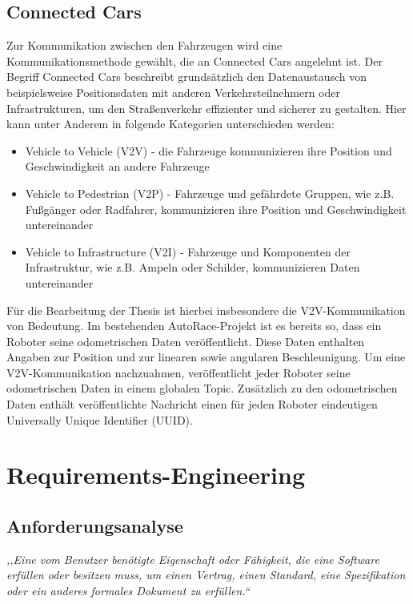 \subsection{Connected Cars}
Zur Kommunikation zwischen den Fahrzeugen wird eine Kommunikationsmethode gewählt, die an Connected Cars angelehnt ist. Der Begriff Connected Cars beschreibt grundsätzlich den Datenaustausch
von beispielsweise Positionsdaten mit anderen Verkehrsteilnehmern oder Infrastrukturen, um den Straßenverkehr effizienter und sicherer zu gestalten. Hier kann unter Anderem in folgende Kategorien unterschieden werden:
\begin{itemize}
  \item Vehicle to Vehicle (V2V) - die Fahrzeuge kommunizieren ihre Position und Geschwindigkeit an andere Fahrzeuge
  \item Vehicle to Pedestrian (V2P) - Fahrzeuge und gefährdete Gruppen, wie z.B. Fußgänger oder Radfahrer, kommunizieren ihre Position und Geschwindigkeit untereinander 
  \item Vehicle to Infrastructure (V2I) - Fahrzeuge und Komponenten der Infrastruktur, wie z.B. Ampeln oder Schilder, kommunizieren Daten untereinander
\end{itemize}

Für die Bearbeitung der Thesis ist hierbei insbesondere die V2V-Kommunikation von Bedeutung. Im bestehenden AutoRace-Projekt ist es bereits so, dass ein Roboter
seine odometrischen Daten veröffentlicht. Diese Daten enthalten Angaben zur Position und zur linearen sowie angularen Beschleunigung. Um eine V2V-Kommunikation nachzuahmen,
veröffentlicht jeder Roboter seine odometrischen Daten in einem globalen Topic. Zusätzlich zu den odometrischen Daten enthält veröffentlichte Nachricht einen für jeden Roboter
eindeutigen Universally Unique Identifier (UUID).

\section{Requirements-Engineering}

\subsection{Anforderungsanalyse}
\textit{,,Eine vom Benutzer benötigte Eigenschaft oder Fähigkeit, die eine Software erfüllen oder besitzen muss, um einen Vertrag, einen Standard, eine Spezifikation oder ein anderes formales Dokument zu erfüllen.``} \cite{IEEE610}


